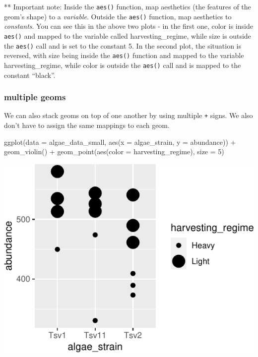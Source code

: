 \documentclass[
]{krantz}
\newenvironment{Shaded}{\begin{snugshade}}{\end{snugshade}}
\newcommand{\AttributeTok}[1]{\textcolor[rgb]{0.77,0.63,0.00}{#1}}
\newcommand{\DecValTok}[1]{\textcolor[rgb]{0.00,0.00,0.81}{#1}}
\newcommand{\FunctionTok}[1]{\textcolor[rgb]{0.00,0.00,0.00}{#1}}
\newcommand{\NormalTok}[1]{#1}
\newcommand{\SpecialCharTok}[1]{\textcolor[rgb]{0.00,0.00,0.00}{#1}}
\begin{document}
** Important note: Inside the \texttt{aes()} function, map aesthetics (the features of the geom's shape) to a \emph{variable}. Outside the \texttt{aes()} function, map aesthetics to \emph{constants}. You can see this in the above two plots - in the first one, color is inside \texttt{aes()} and mapped to the variable called harvesting\_regime, while size is outside the \texttt{aes()} call and is set to the constant 5. In the second plot, the situation is reversed, with size being inside the \texttt{aes()} function and mapped to the variable harvesting\_regime, while color is outside the \texttt{aes()} call and is mapped to the constant ``black''.

\hypertarget{multiple-geoms}{%
\subsubsection{multiple geoms}\label{multiple-geoms}}

We can also stack geoms on top of one another by using multiple \texttt{+} signs. We also don't have to assign the same mappings to each geom.

\begin{Shaded}
\begin{Highlighting}[]
\FunctionTok{ggplot}\NormalTok{(}\AttributeTok{data =}\NormalTok{ algae\_data\_small, }\FunctionTok{aes}\NormalTok{(}\AttributeTok{x =}\NormalTok{ algae\_strain, }\AttributeTok{y =}\NormalTok{ abundance)) }\SpecialCharTok{+} 
  \FunctionTok{geom\_violin}\NormalTok{() }\SpecialCharTok{+}
  \FunctionTok{geom\_point}\NormalTok{(}\FunctionTok{aes}\NormalTok{(}\AttributeTok{color =}\NormalTok{ harvesting\_regime), }\AttributeTok{size =} \DecValTok{5}\NormalTok{)}
\end{Highlighting}
\end{Shaded}

\begin{center}\includegraphics{index_files/figure-latex/unnamed-chunk-26-1} \end{center}
\end{document}

